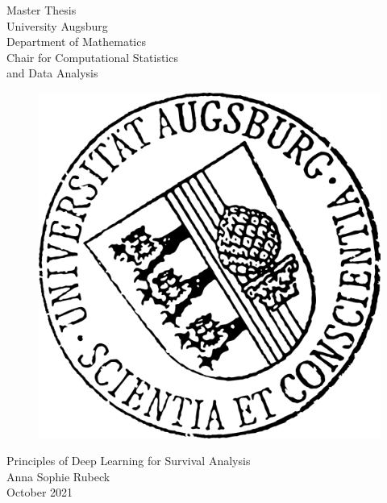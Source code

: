 \documentclass[12pt, a4paper]{scrartcl}
\theoremstyle{definition}
\theoremstyle{plain}
\numberwithin{equation}{section}
\numberwithin{figure}{section}
\numberwithin{table}{section}
\begin{document}
	
	\listoftodos
	\newpage

	\begin{center}
		\Huge Master Thesis\\
		\vspace{0.5cm}
		\LARGE University Augsburg\\
		\vspace{0.3cm}
		Department of Mathematics\\
		\vspace{0.3cm}
		Chair for Computational Statistics\\ and Data Analysis
		\vspace{0.7cm}
		
		
	\end{center}
	\vspace{0.5cm}
	
	\begin{figure}[h]
		\begin{center}
			\includegraphics[scale=1.35]
			{Uni_Aug_Siegel_32Grad_schwarz.png}
		\end{center}
	\end{figure}
	
	\begin{center}
		\vspace{0.4cm}
		{\LARGE{{Principles of Deep Learning for Survival Analysis}}}\\
		\vspace{2cm}
		\LARGE {Anna Sophie Rubeck}\\
		\vspace{0.9cm}
		\large{October 2021}
	\end{center}
	\newpage
\end{document}
